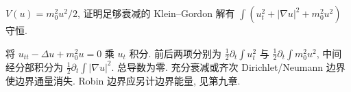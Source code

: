 \begin{exercise}
$V(u)=m_0^2u^2/2$, 证明足够衰减的 Klein--Gordon 解有 $\int(u_t^2+|\nabla u|^2+m_0^2u^2)$ 守恒.
\end{exercise}
\begin{solution}
将 $u_{tt}-\Delta u+m_0^2u=0$ 乘 $u_t$ 积分. 前后两项分别为 $\tfrac12\partial_t\int u_t^2$ 与 $\tfrac12\partial_t\int m_0^2u^2$, 中间经分部积分为 $\tfrac12\partial_t\int|\nabla u|^2$. 总导数为零. 充分衰减或齐次 Dirichlet/Neumann 边界使边界通量消失. Robin 边界应另计边界能量, 见第九章.
\end{solution}
